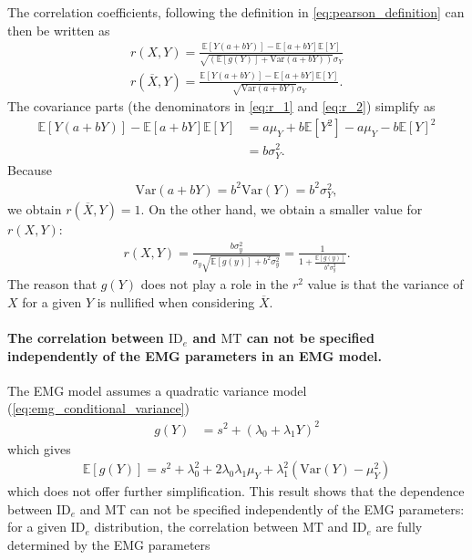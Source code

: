 \documentclass[acmlarge, manuscript,review]{acmart}
\newcommand{\mt}{\ensuremath{{\text{MT}}}\xspace}
\newcommand{\ide}{\ensuremath{{\text{ID}_e}}\xspace}
\begin{document}
The correlation coefficients, following the definition in \autoref{eq:pearson_definition} can then be written as
\begin{align}
	r(X,Y)  = \frac{\mathbb{E}[Y(a + bY)] - \mathbb{E}[a + bY]\mathbb{E}[Y] }{\sqrt{(\mathbb{E}[g(Y)] + \text{Var}(a + bY))}\sigma_Y} \label{eq:r_1} \\
	r(\overline{X}, Y) = \frac{\mathbb{E}[Y(a + bY)] - \mathbb{E}[a + bY]\mathbb{E}[Y] }{\sqrt{\text{Var}(a + bY)}\sigma_Y}. \label{eq:r_2}
\end{align}
The covariance parts (\ie the denominators in \autoref{eq:r_1} and \autoref{eq:r_2}) simplify as
\begin{align}
	\mathbb{E}[Y(a + bY)] - \mathbb{E}[a + bY]\mathbb{E}[Y] & = a \mu_Y + b\mathbb{E}[Y^2] - a\mu_Y - b\mathbb{E}[Y]^2 \\
	                                                        & = b\sigma_Y^2.
\end{align}
Because
\begin{align}
	\text{Var}(a + bY) = b^2\text{Var}(Y) = b^2\sigma_Y^2,
\end{align}
we obtain $r(\overline{X}, Y) = 1$. On the other hand, we obtain a smaller value for $r(X,Y)$:
\begin{align}
	r(X,Y) = \frac{b\sigma_y^2}{\sigma_y\sqrt{\mathbb{E}[g(y)] + b^2\sigma_y^2}} = \frac{1}{1 + \frac{\mathbb{E}[g(y)]}{b^2\sigma_y^2}}.
\end{align}
The reason that $g(Y)$ does not play a role in the $r^2$ value is that the variance of $X$ for a given $Y$ is nullified when considering $\overline{X}$. 

\paragraph{The correlation between \ide and \mt can not be specified independently of the EMG parameters in an EMG model.}
The EMG model assumes a quadratic variance model (\autoref{eq:emg_conditional_variance})
\begin{align}
	g(Y) & = s^2 + (\lambda_0  + \lambda_1 Y)^2
\end{align}
which gives
\begin{align}
	\mathbb{E}[g(Y)] = s^2 + \lambda_0^2 + 2\lambda_0\lambda_1\mu_Y + \lambda_1^2(\text{Var}(Y) - \mu_Y^2)
\end{align}
which does not offer further simplification. This result shows that the dependence between \ide and MT can not be specified independently of the EMG parameters: for a given \ide distribution, the correlation between \mt and \ide are fully determined by the EMG parameters
\end{document}
